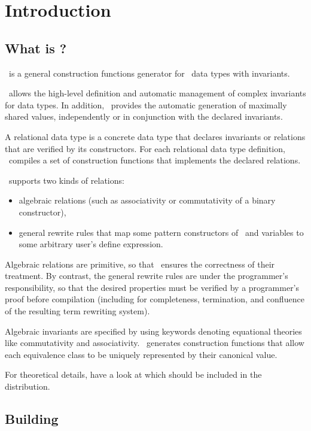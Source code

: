 
\chapter{Introduction}
\label{sec:intro}

\section{What is \moca ?}
\moca\ is a general construction functions generator for \ocaml\ data types
with invariants.

\moca\ allows the high-level definition and automatic management of
complex invariants for data types. In addition, \moca\ provides the
automatic generation of maximally shared values, independently or in
conjunction with the declared invariants.

A relational data type is a concrete data type that declares
invariants or relations that are verified by its constructors. For
each relational data type definition, \moca\ compiles a set of
construction functions that implements the declared relations.

\moca\ supports two kinds of relations:
\begin{itemize}
\item algebraic relations (such as associativity or commutativity of a
binary constructor), 
\item general rewrite rules that map some pattern constructors
of \moca\ and variables to some arbitrary user's define expression.
\end{itemize}

Algebraic relations are primitive, so that \moca\ ensures the
correctness of their treatment. By contrast, the general rewrite rules
are under the programmer's responsibility, so that the desired
properties must be verified by a programmer's proof before compilation
(including for completeness, termination, and confluence of the
resulting term rewriting system).

Algebraic invariants are specified by using keywords denoting
equational theories like commutativity and associativity. \moca\
generates construction functions that allow each equivalence class to
be uniquely represented by their canonical value.

For theoretical details, have a look at \cite{moca07} which should be
included in the distribution.

\section{Building \moca}

